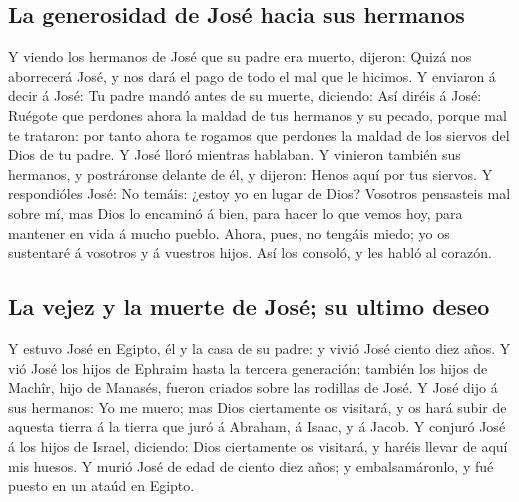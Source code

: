 \hypertarget{la-generosidad-de-josuxe9-hacia-sus-hermanos}{%
\subsection{La generosidad de José hacia sus
hermanos}\label{la-generosidad-de-josuxe9-hacia-sus-hermanos}}

 Y viendo los hermanos de José que su padre era muerto,
dijeron: Quizá nos aborrecerá José, y nos dará el pago de todo el mal
que le hicimos.  Y enviaron á decir á José: Tu padre
mandó antes de su muerte, diciendo:  Así diréis á José:
Ruégote que perdones ahora la maldad de tus hermanos y su pecado, porque
mal te trataron: por tanto ahora te rogamos que perdones la maldad de
los siervos del Dios de tu padre. Y José lloró mientras hablaban.
 Y vinieron también sus hermanos, y postráronse delante
de él, y dijeron: Henos aquí por tus siervos.  Y
respondióles José: No temáis: ¿estoy yo en lugar de Dios?
 Vosotros pensasteis mal sobre mí, mas Dios lo encaminó á
bien, para hacer lo que vemos hoy, para mantener en vida á mucho pueblo.
 Ahora, pues, no tengáis miedo; yo os sustentaré á
vosotros y á vuestros hijos. Así los consoló, y les habló al corazón.

\hypertarget{la-vejez-y-la-muerte-de-josuxe9-su-ultimo-deseo}{%
\subsection{La vejez y la muerte de José; su ultimo
deseo}\label{la-vejez-y-la-muerte-de-josuxe9-su-ultimo-deseo}}

 Y estuvo José en Egipto, él y la casa de su padre: y
vivió José ciento diez años.  Y vió José los hijos de
Ephraim hasta la tercera generación: también los hijos de Machîr, hijo
de Manasés, fueron criados sobre las rodillas de José.  Y
José dijo á sus hermanos: Yo me muero; mas Dios ciertamente os visitará,
y os hará subir de aquesta tierra á la tierra que juró á Abraham, á
Isaac, y á Jacob.  Y conjuró José á los hijos de Israel,
diciendo: Dios ciertamente os visitará, y haréis llevar de aquí mis
huesos.  Y murió José de edad de ciento diez años; y
embalsamáronlo, y fué puesto en un ataúd en Egipto.
